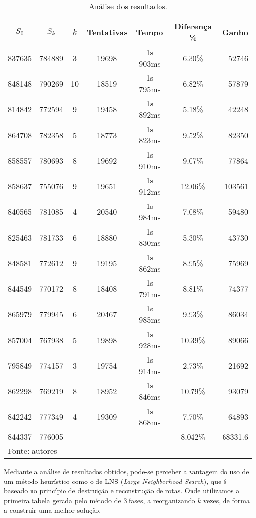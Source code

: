 \documentclass[12pt,a4paper]{article}
\renewcommand*{\arraystretch}{1.2}
\numberwithin{figure}{section}
\numberwithin{table}{section}
\begin{document}
\begin{table}[H]
	\renewcommand{\arraystretch}{1}
	\centering
	\caption{Análise dos resultados.}
	\label{tab:resultados}
	\begin{tabular}{*{6}{c} r}
		\toprule 
		$S_{0}$ & $S_{k}$ & $k$ & Tentativas & Tempo & Diferença \% & Ganho \\ 
		\midrule
		837635 & 784889 &  3 & 19698 & 1s 903ms &  6.30\% &  52746 \\
		848148 & 790269 & 10 & 18519 & 1s 795ms &  6.82\% &  57879 \\
		814842 & 772594 &  9 & 19458 & 1s 892ms &  5.18\% &  42248 \\
		864708 & 782358 &  5 & 18773 & 1s 823ms &  9.52\% &  82350 \\
		858557 & 780693 &  8 & 19692 & 1s 910ms &  9.07\% &  77864 \\
		858637 & 755076 &  9 & 19651 & 1s 912ms & 12.06\% & 103561 \\
		840565 & 781085 &  4 & 20540 & 1s 984ms &  7.08\% &  59480 \\
		825463 & 781733 &  6 & 18880 & 1s 830ms &  5.30\% &  43730 \\
		848581 & 772612 &  9 & 19195 & 1s 862ms &  8.95\% &  75969 \\
		844549 & 770172 &  8 & 18408 & 1s 791ms &  8.81\% &  74377 \\
		865979 & 779945 &  6 & 20467 & 1s 985ms &  9.93\% &  86034 \\
		857004 & 767938 &  5 & 19898 & 1s 928ms & 10.39\% &  89066 \\
		795849 & 774157 &  3 & 19754 & 1s 914ms &  2.73\% &  21692 \\
		862298 & 769219 &  8 & 18952 & 1s 846ms & 10.79\% &  93079 \\
		842242 & 777349 &  4 & 19309 & 1s 868ms &  7.70\% &  64893 \\
		\midrule
		844337 & 776005 &    &       &          &  8.042\% &  68331.6 \\
		\bottomrule
		\multicolumn{6}{l}{\footnotesize Fonte: autores}
	\end{tabular}
\end{table}

Mediante a análise de resultados obtidos, pode-se perceber a vantagem do uso de um método heurístico como o de LNS (\textit{Large Neighborhood Search}), que é baseado no princípio de destruição e reconstrução de rotas. Onde utilizamos a primeira tabela gerada pelo método de 3 fases, a reorganizando $k$ vezes, de forma a construir uma melhor solução. 
\end{document}
